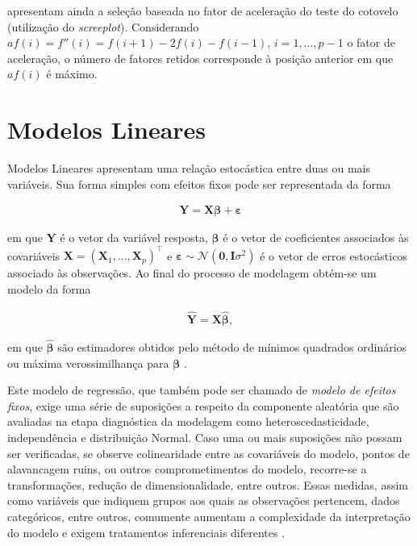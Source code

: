 \documentclass[12pt, a4paper, twoside]{report}
\numberwithin{equation}{subsection} %
\begin{document}
\cite{morettindatasci} apresentam ainda a seleção baseada no fator de aceleração do teste do cotovelo (utilização do \textit{screeplot}). Considerando $af(i) = f''(i) = f(i+1) - 2f(i) - f(i-1)$, $i = 1, \dots, p-1$ o fator de aceleração, o número de fatores retidos corresponde à posição anterior em que $af(i)$ é máximo.



\section{Modelos Lineares}

Modelos Lineares apresentam uma relação estocástica entre duas ou mais variáveis. Sua forma simples com efeitos fixos pode ser representada da forma

\begin{align}
	\mathbf{Y} = \mathbf{X} \boldsymbol{\beta + \varepsilon} \label{relacao_linear_basica}
\end{align}

\noindent em que $\mathbf{Y}$ é o vetor da variável resposta, $\boldsymbol{\beta}$ é o vetor de coeficientes associados às covariáveis $\mathbf{X} = \left( \mathbf{X}_1, \dots, \mathbf{X}_p \right)^\top$ e $\boldsymbol{\varepsilon} \sim \mathcal{N}(\mathbf{0}, \mathbf{I}\sigma^2)$ é o vetor de erros estocásticos associado às observações. Ao final do processo de modelagem obtém-se um modelo da forma


\begin{align}
	\hat{\mathbf{Y}} = \mathbf{X} \boldsymbol{\hat{\beta}}, \label{modelo_linear_basico}
\end{align}

\noindent em que $\hat{\boldsymbol{\beta}}$ são estimadores obtidos pelo método de mínimos quadrados ordinários ou máxima verossimilhança para $\boldsymbol{\beta}$ \citep{kutner2005applied}.

Este modelo de regressão, que também pode ser chamado de \textit{modelo de efeitos fixos}, exige uma série de suposições a respeito da componente aleatória que são avaliadas na etapa diagnóstica da modelagem como heteroscedasticidade, independência e distribuição Normal. Caso uma ou mais suposições não possam ser verificadas, se observe colinearidade entre as covariáveis do modelo, pontos de alavancagem ruins, ou outros comprometimentos do modelo, recorre-se a  transformações, redução de dimensionalidade, entre outros. Essas medidas, assim como variáveis que indiquem grupos aos quais as observações pertencem, dados categóricos, entre outros, comumente aumentam a complexidade da interpretação do modelo e exigem tratamentos inferenciais diferentes \citep{hox2017multilevel}.
\end{document}
